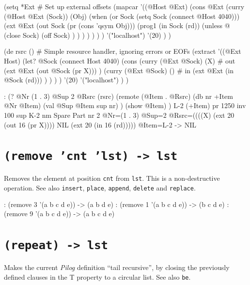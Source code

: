 \begin{wideverbatim}
(setq *Ext           # Set up external offsets
   (mapcar
      '((@Host @Ext)
         (cons @Ext
            (curry (@Host @Ext (Sock)) (Obj)
               (when (or Sock (setq Sock (connect @Host 4040)))
                  (ext @Ext
                     (out Sock (pr (cons 'qsym Obj)))
                     (prog1 (in Sock (rd))
                        (unless @
                           (close Sock)
                           (off Sock) ) ) ) ) ) ) )
      '("localhost")
      '(20) ) )

(de rsrc ()  # Simple resource handler, ignoring errors or EOFs
   (extract
      '((@Ext Host)
         (let? @Sock (connect Host 4040)
            (cons
               (curry (@Ext @Sock) (X)  # out
                  (ext @Ext (out @Sock (pr X))) )
               (curry (@Ext @Sock) ()  # in
                  (ext @Ext (in @Sock (rd))) ) ) ) )
      '(20)
      '("localhost") ) )

: (?
   @Nr (1 . 3)
   @Sup 2
   @Rsrc (rsrc)
   (remote (@Item . @Rsrc)
      (db nr +Item @Nr @Item)
      (val @Sup @Item sup nr) )
   (show @Item) )
{L-2} (+Item)
   pr 1250
   inv 100
   sup {K-2}
   nm Spare Part
   nr 2
 @Nr=(1 . 3) @Sup=2 @Rsrc=((((X) (ext 20 (out 16 (pr X)))) 
      NIL (ext 20 (in 16 (rd))))) @Item={L-2}
-> NIL
\end{wideverbatim}

 
\section*{\texttt{(remove 'cnt 'lst) -> lst}}
\label{sec:func-ref-R-(remove 'cnt 'lst) -> lst}


Removes the element at position \texttt{cnt} from \texttt{lst}. This is a
non-destructive operation. See also \texttt{insert}, \texttt{place}, \texttt{append},
\texttt{delete} and \texttt{replace}.


\begin{wideverbatim}
: (remove 3 '(a b c d e))
-> (a b d e)
: (remove 1 '(a b c d e))
-> (b c d e)
: (remove 9 '(a b c d e))
-> (a b c d e)
\end{wideverbatim}

 
\section*{\texttt{(repeat) -> lst}}
\label{sec:func-ref-R-(repeat) -> lst}


Makes the current \emph{Pilog} definition ``tail recursive'',
by closing the previously defined clauses in the T property to a
circular list. See also \texttt{be}.



